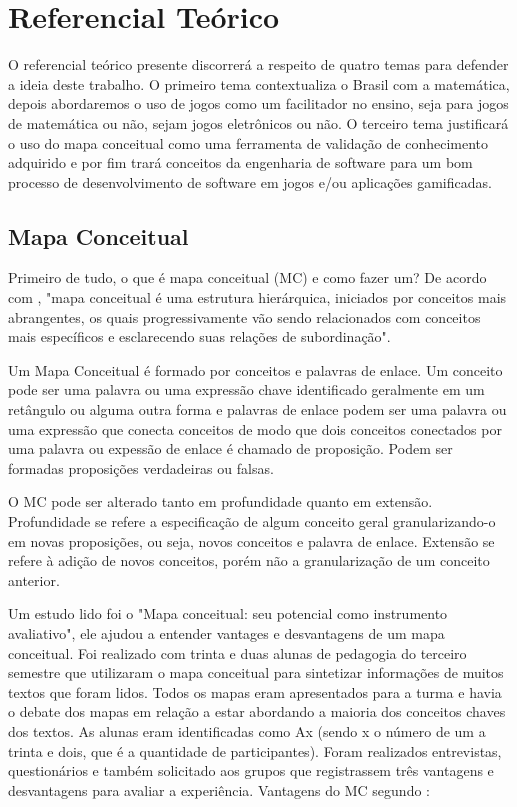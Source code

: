 \chapter[Referencial Teórico]{Referencial Teórico}
O referencial teórico presente discorrerá a respeito de quatro temas para defender a ideia deste trabalho. O primeiro tema contextualiza o Brasil com a matemática, depois abordaremos o uso de jogos como um facilitador no ensino, seja para jogos de matemática ou não, sejam jogos eletrônicos ou não. O terceiro tema justificará o uso do mapa conceitual como uma ferramenta de validação de conhecimento adquirido e por fim trará conceitos da engenharia de software para um bom processo de desenvolvimento de software em jogos e/ou aplicações gamificadas. 





\section[Mapa Conceitual]{Mapa Conceitual}
Primeiro de tudo, o que é mapa conceitual (MC) e como fazer um? De acordo com , "mapa conceitual é uma estrutura hierárquica, iniciados por conceitos mais abrangentes, os quais progressivamente vão sendo relacionados com conceitos mais específicos e esclarecendo suas relações de subordinação".

Um Mapa Conceitual é formado por conceitos e palavras de enlace. Um conceito pode ser uma palavra ou uma expressão chave identificado geralmente em um retângulo ou alguma outra forma e palavras de enlace podem ser uma palavra ou uma expressão que conecta conceitos de modo que dois conceitos conectados por uma palavra ou expessão de enlace é chamado de proposição. Podem ser formadas proposições verdadeiras ou falsas.

O MC pode ser alterado tanto em profundidade quanto em extensão. Profundidade se refere a especificação de algum conceito geral granularizando-o em novas proposições, ou seja, novos conceitos e palavra de enlace. Extensão se refere à adição de novos conceitos, porém não a granularização de um conceito anterior.

Um estudo lido foi o "Mapa conceitual: seu potencial como instrumento avaliativo", ele ajudou a entender vantages e desvantagens de um mapa conceitual. Foi realizado com trinta e duas alunas de pedagogia do terceiro semestre que utilizaram o mapa conceitual para sintetizar informações de muitos textos que foram lidos. Todos os mapas eram apresentados para a turma e havia o debate dos mapas em relação a estar abordando a maioria dos conceitos chaves dos textos. As alunas eram identificadas como Ax (sendo x o número de um a trinta e dois, que é a quantidade de participantes). Foram realizados entrevistas, questionários e também solicitado aos grupos que registrassem três vantagens e desvantagens para avaliar a experiência. Vantagens do MC segundo \cite{vantagensDesvantagensMC}: 

